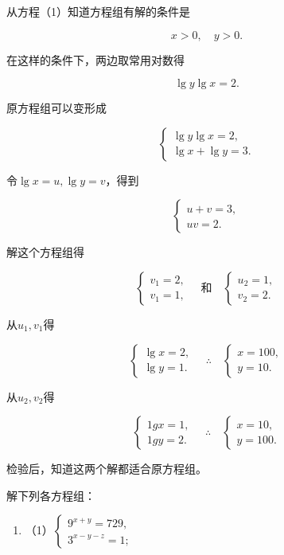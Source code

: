  从方程（1）知道方程组有解的条件是

\[
x > 0, \quad y > 0.
\]

在这样的条件下，两边取常用对数得

\[
\lg y \lg x = 2.
\]

原方程组可以变形成

\[
\left\{ \begin{array}{l} \lg y \lg x = 2, \\ \lg x + \lg y = 3. \end{array} \right. \tag {3}
\]

令\(\lg x = u, \lg y = v\)，得到

\[
\left\{ \begin{array}{c} u + v = 3, \\ u v = 2. \end{array} \right.
\]

解这个方程组得

\[
\left\{ \begin{array}{ll} v_{1} = 2, \\ v_{1} = 1, \end{array} \right. \quad \text{和} \quad \left\{ \begin{array}{ll} u_{2} = 1, \\ v_{2} = 2. \end{array} \right.
\]

从\(u_{1}, v_{1}\)得

\[
\left\{ \begin{array}{ll} \lg x = 2, \\ \lg y = 1. \end{array} \right. \quad \therefore \quad \left\{ \begin{array}{ll} x = 100, \\ y = 10. \end{array} \right.
\]

从\(u_{2}, v_{2}\)得

\[
\left\{ \begin{array}{ll} 1 g x = 1, \\ 1 g y = 2. \end{array} \right. \quad \therefore \quad \left\{ \begin{array}{ll} x = 10, \\ y = 100. \end{array} \right.
\]

检验后，知道这两个解都适合原方程组。

解下列各方程组：

\begin{enumerate}
\item
  （1）\(\left\{ \begin{array}{l} 9^{x + y} = 729, \\ 3^{x - y - z} = 1; \end{array} \right.\)
\end{enumerate}

